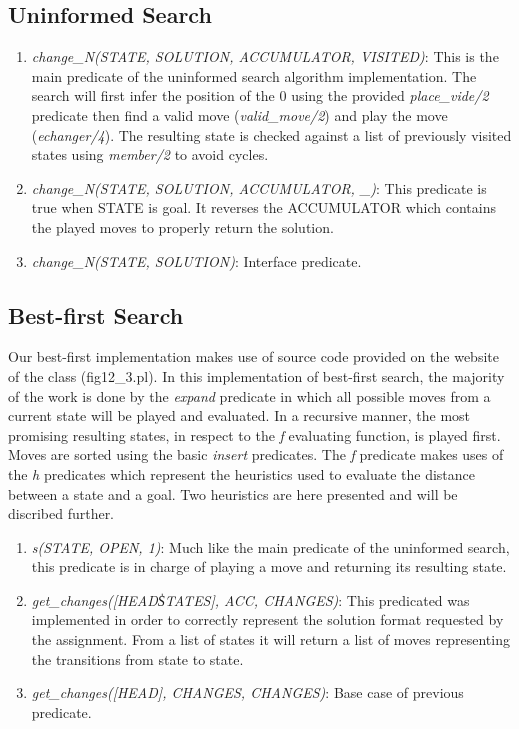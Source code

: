 \documentclass[12pt]{article}
\begin{document}
\subsection{Uninformed Search}
\begin{enumerate}[-]
\item
\textit{change\_N(STATE, SOLUTION, ACCUMULATOR, VISITED)}:
This is the main predicate of the uninformed search algorithm implementation.  The search will first infer the position of the 0 using the provided \textit{place\_vide/2} predicate then find a valid move (\textit{valid\_move/2}) and play the move (\textit{echanger/4}).  The resulting state is checked against a list of previously visited states using \textit{member/2} to avoid cycles.
\item
\textit{change\_N(STATE, SOLUTION, ACCUMULATOR, \_)}:
This predicate is true when STATE is goal. It reverses the ACCUMULATOR which contains the played moves to properly return the solution.
\item 
\textit{change\_N(STATE, SOLUTION)}:
Interface predicate.
\end{enumerate}

\subsection{Best-first Search}
Our best-first implementation makes use of source code provided on the website of the class (fig12\_3.pl).  In this implementation of best-first search, the majority of the work is done by the \textit{expand} predicate in which all possible moves from a current state will be played and evaluated.  In a recursive manner, the most promising resulting states, in respect to the \textit{f} evaluating function, is played first.  Moves are sorted using the basic \textit{insert} predicates.  The \textit{f} predicate makes uses of the \textit{h} predicates which represent the heuristics used to evaluate the distance between a state and a goal.  Two heuristics are here presented and will be discribed further.
\begin{enumerate}[-]
\item
\textit{s(STATE, OPEN, 1)}:
Much like the main predicate of the uninformed search, this predicate is in charge of playing a move and returning its resulting state.
\item
\textit{get\_changes([HEAD\|STATES], ACC, CHANGES)}:
This predicated was implemented in order to correctly represent the solution format requested by the assignment.  From a list of states it will return a list of moves representing the transitions from state to state.
\item
\textit{get\_changes([HEAD], CHANGES, CHANGES)}:
Base case of previous predicate.
\end{enumerate}
\end{document}
